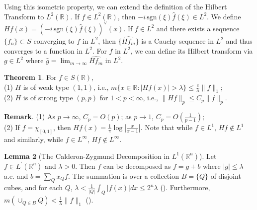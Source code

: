 \documentclass[12pt,openany]{book}
\theoremstyle{definition}
\newtheorem{theorem}{Theorem}[section]
\newtheorem{lemma}[theorem]{Lemma}
\begin{document}
Using this isometric property, we can extend the definition of the Hilbert Transform to $L^2(\mathbb{R})$. If $f \in L^2(\mathbb{R})$, then $-i \, \text{sgn}(\xi) \hat{f}(\xi) \in L^2$. We define $Hf(x) = (-i \, \text{sgn}(\xi) \hat{f}(\xi))^\vee(x)$. If $f \in L^2$ and there exists a sequence $\{f_n\} \subset S$ converging to $f$ in $L^2$, then $\{\hat{Hf_m}\}$ is a Cauchy sequence in $L^2$ and thus converges to a function in $L^2$.
For $f$ in $L^2$, we can define its Hilbert transform via $g \in L^2$ where $\hat{g} = \lim_{{m \to \infty}} \widehat{H f_m}$ in $L^2$.

\begin{theorem}\label{thm3.1.6}
    For $f \in S(\mathbb{R})$,\\
(1) $H$ is of weak type $(1,1)$, i.e., $m\{x \in \mathbb{R}: |H f(x)| > \lambda\} \leqslant \frac{c}{\lambda} \|f\|_1$;\\
(2) $H$ is of strong type $(p, p)$ for $1 < p < \infty$, i.e., $\|H f\|_p \leqslant C_p \|f\|_p$.
\end{theorem} 
\noindent\textbf{Remark}. (1) As $p \to \infty$, $C_p = O(p)$; as $p \to 1$, $C_p = O\left(\frac{1}{p-1}\right)$;\\
(2) If $f = \chi_{[0,1]}$, then $H f(x) = \frac{1}{\pi} \log \left|\frac{x}{x-1}\right|$. Note that while $f \in L^1$, $H f \notin L^1$ and similarly, while $f \in L^{\infty}$, $H f \notin L^{\infty}$.
\begin{lemma}[The Calderon-Zygmund Decomposition in $L^{1}\left(\mathbb{R}^n\right)$]
    Let $f \in L^{\prime}\left(\mathbb{R}^n\right)$ and $\lambda > 0$. Then $f$ can be decomposed as $f = g + b$ where $|g| \leqslant \lambda$ a.e. and $b = \sum_Q x_Q f$. The summation is over a collection $B = \{Q\}$ of disjoint cubes, and for each $Q$, $\lambda < \frac{1}{|Q|} \int_Q |f(x)| dx \leqslant 2^n \lambda $ (). Furthermore, $m\left(\cup_{Q \in B} Q\right) < \frac{1}{\lambda} \|f\|_1$ ().
\end{lemma}
\end{document}
